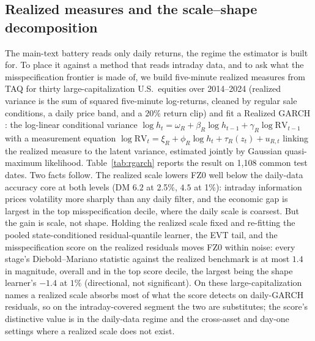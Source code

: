 \documentclass[11pt]{article}
\begin{document}
\subsection*{Realized measures and the scale--shape decomposition}\label{sec:rgarch-oa}
The main-text battery reads only daily returns, the regime the estimator is built
for. To place it against a method that reads intraday data, and to ask what the
misspecification frontier is made of, we build five-minute realized measures from
TAQ for thirty large-capitalization U.S.\ equities over 2014--2024 (realized
variance is the sum of squared five-minute log-returns, cleaned by regular sale
conditions, a daily price band, and a $20\%$ return clip) and fit a Realized GARCH
\citep{hansen2012realized}: the log-linear conditional variance
$\log h_t=\omega_R+\beta_R\log h_{t-1}+\gamma_R\log \mathrm{RV}_{t-1}$ with a measurement
equation $\log\mathrm{RV}_t=\xi_R+\phi_R\log h_t+\tau_R(z_t)+u_{R,t}$ linking the realized
measure to the latent variance, estimated jointly by Gaussian quasi-maximum
likelihood. Table~\ref{tab:rgarch} reports the result on 1{,}108 common test dates.
Two facts follow. The realized scale lowers FZ0 well below the daily-data accuracy
core at both levels (DM $6.2$ at 2.5\%, $4.5$ at 1\%): intraday information prices
volatility more sharply than any daily filter, and the economic gap is largest in
the top misspecification decile, where the daily scale is coarsest. But the gain is
scale, not shape. Holding the realized scale fixed and re-fitting the pooled
state-conditioned residual-quantile learner, the EVT tail, and the misspecification
score on the realized residuals moves FZ0 within noise: every stage's
Diebold--Mariano statistic against the realized benchmark is at most $1.4$ in
magnitude, overall and in the top score decile, the largest being the shape learner's
$-1.4$ at $1\%$ (directional, not significant). On these large-capitalization names a
realized scale absorbs most of what the score detects on daily-GARCH residuals, so on
the intraday-covered segment the two are substitutes; the score's distinctive value is
in the daily-data regime and the cross-asset and day-one settings where a realized
scale does not exist.
\end{document}
